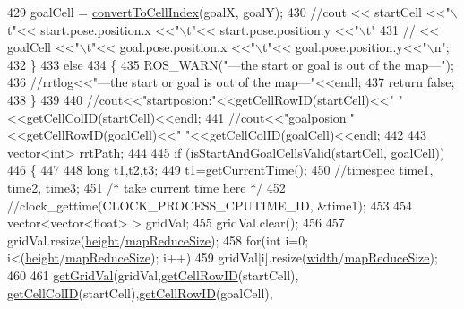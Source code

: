 \begin{DoxyCode}
{{{429         goalCell = \hyperlink{classrrt__plan_1_1rrt__planner_a2647265d06a792b983b372af52cf5677}{convertToCellIndex}(goalX, goalY);
430         \textcolor{comment}{//cout << startCell <<"\(\backslash\)t"<< start.pose.position.x <<"\(\backslash\)t"<< start.pose.position.y <<"\(\backslash\)t"}
431         \textcolor{comment}{//    << goalCell <<"\(\backslash\)t"<< goal.pose.position.x <<"\(\backslash\)t"<< goal.pose.position.y<<"\(\backslash\)n";}
432     \}
433     \textcolor{keywordflow}{else}
434     \{
435         ROS\_WARN(\textcolor{stringliteral}{"---the start or goal is out of the map---"});
436         \textcolor{comment}{//rrtlog<<"---the start or goal is out of the map---"<<endl;}
437         \textcolor{keywordflow}{return} \textcolor{keyword}{false};
438     \}
439 
440     \textcolor{comment}{//cout<<"startposion:"<<getCellRowID(startCell)<<"  "<<getCellColID(startCell)<<endl;}
441     \textcolor{comment}{//cout<<"goalposion:"<<getCellRowID(goalCell)<<"  "<<getCellColID(goalCell)<<endl;}
442 
443     vector<int> rrtPath;
444 
445     \textcolor{keywordflow}{if} (\hyperlink{classrrt__plan_1_1rrt__planner_aa43a4ec62844e679d9e0aefcbfa5f286}{isStartAndGoalCellsValid}(startCell, goalCell))
446     \{
447      
448             \textcolor{keywordtype}{long} t1,t2,t3;
449             t1=\hyperlink{rrt__planner_8cpp_a3b34910310800875174c4846e64a61bd}{getCurrentTime}();
450             \textcolor{comment}{//timespec time1, time2, time3;}
451             \textcolor{comment}{/* take current time here */}
452             \textcolor{comment}{//clock\_gettime(CLOCK\_PROCESS\_CPUTIME\_ID, &time1);}
453 
454             vector<vector<float> > gridVal;
455             gridVal.clear();
456 
457             gridVal.resize(\hyperlink{classrrt__plan_1_1rrt__planner_a3549de56a50bff6494514878b64584df}{height}/\hyperlink{rrt_8h_afb8b6147953aaf9e7089f5f157d5b020}{mapReduceSize});
458             \textcolor{keywordflow}{for}(\textcolor{keywordtype}{int} i=0; i<(\hyperlink{classrrt__plan_1_1rrt__planner_a3549de56a50bff6494514878b64584df}{height}/\hyperlink{rrt_8h_afb8b6147953aaf9e7089f5f157d5b020}{mapReduceSize}); i++)
459                 gridVal[i].resize(\hyperlink{classrrt__plan_1_1rrt__planner_ac74fe436b5e1fa30bda1fbe821369aa2}{width}/\hyperlink{rrt_8h_afb8b6147953aaf9e7089f5f157d5b020}{mapReduceSize});
460 
461             \hyperlink{classrrt__plan_1_1rrt__planner_aff6d98168c072b176287fc9c444349c6}{getGridVal}(gridVal,\hyperlink{classrrt__plan_1_1rrt__planner_aa3c07d6b2b6bed62e4b60d3898fc80cf}{getCellRowID}(startCell), 
      \hyperlink{classrrt__plan_1_1rrt__planner_a758810b2f257fe0778ed3eb1e970d99c}{getCellColID}(startCell),\hyperlink{classrrt__plan_1_1rrt__planner_aa3c07d6b2b6bed62e4b60d3898fc80cf}{getCellRowID}(goalCell), 
}}}
\end{DoxyCode}
